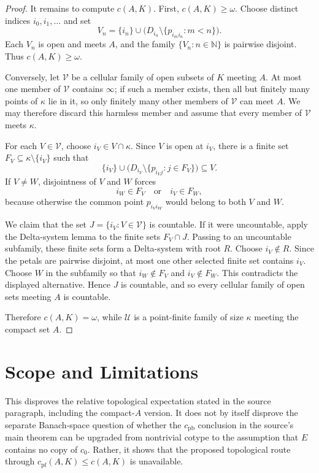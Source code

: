 \documentclass[11pt]{article}
\newcommand{\cf}{c_{\mathrm{pf}}}
\newcommand{\calU}{\mathcal U}
\newcommand{\N}{\mathbb N}
\begin{document}
\begin{proof}
It remains to compute $c(A,K)$.  First, $c(A,K)\ge\omega$.  Choose distinct
indices $i_0,i_1,\ldots$ and set
\[
  V_n=\{i_n\}\cup
  \bigl(D_{i_n}\setminus\{p_{i_m i_n}:m<n\}\bigr).
\]
Each $V_n$ is open and meets $A$, and the family $\{V_n:n\in\N\}$ is
pairwise disjoint.  Thus $c(A,K)\ge\omega$.

Conversely, let $\mathcal V$ be a cellular family of open subsets of $K$
meeting $A$.  At most one member of $\mathcal V$ contains $\infty$; if such a
member exists, then all but finitely many points of $\kappa$ lie in it, so
only finitely many other members of $\mathcal V$ can meet $A$.  We may
therefore discard this harmless member and assume that every member of
$\mathcal V$ meets $\kappa$.

For each $V\in\mathcal V$, choose $i_V\in V\cap\kappa$.  Since $V$ is open
at $i_V$, there is a finite set $F_V\subseteq \kappa\setminus\{i_V\}$ such
that
\[
  \{i_V\}\cup
  \bigl(D_{i_V}\setminus\{p_{i_V j}:j\in F_V\}\bigr)
  \subseteq V .
\]
If $V\ne W$, disjointness of $V$ and $W$ forces
\[
  i_W\in F_V \quad\text{or}\quad i_V\in F_W,
\]
because otherwise the common point $p_{i_V i_W}$ would belong to both
$V$ and $W$.

We claim that the set $J=\{i_V:V\in\mathcal V\}$ is countable.  If it were
uncountable, apply the Delta-system lemma to the finite sets
$F_V\cap J$.  Passing to an uncountable subfamily, these finite sets form a
Delta-system with root $R$.  Choose $i_V\notin R$.  Since the petals are
pairwise disjoint, at most one other selected finite set contains $i_V$.
Choose $W$ in the subfamily so that $i_W\notin F_V$ and $i_V\notin F_W$.
This contradicts the displayed alternative.  Hence $J$ is countable, and so
every cellular family of open sets meeting $A$ is countable.

Therefore $c(A,K)=\omega$, while $\calU$ is a point-finite family of size
$\kappa$ meeting the compact set $A$.
\end{proof}

\section*{Scope and Limitations}

This disproves the relative topological expectation stated in the source
paragraph, including the compact-$A$ version.  It does not by itself disprove
the separate Banach-space question of whether the $c_{\mathrm{pb}}$
conclusion in the source's main theorem can be upgraded from nontrivial cotype
to the assumption that $E$ contains no copy of $c_0$.
Rather, it shows that the proposed topological route through
$\cf(A,K)\le c(A,K)$ is unavailable.
\end{document}
